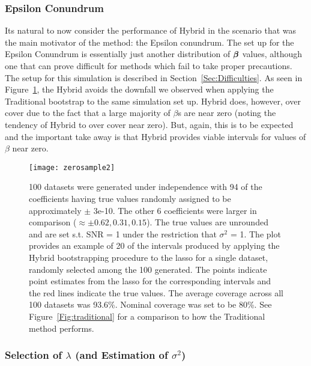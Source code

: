 \subsubsection{Epsilon Conundrum}\label{Sec:Epsilon}

Its natural to now consider the performance of Hybrid in the scenario that was the main motivator of the method: the Epsilon conundrum. The set up for the Epsilon Conundrum is essentially just another distribution of $\boldsymbol{\beta}$ values, although one that can prove difficult for methods which fail to take proper precautions. The setup for this simulation is described in Section~\ref{Sec:Difficulties}. As seen in Figure~\ref{Fig:zerosample2}, the Hybrid avoids the downfall we observed when applying the Traditional bootstrap to the same simulation set up. Hybrid does, however, over cover due to the fact that a large majority of $\beta$s are near zero (noting the tendency of Hybrid to over cover near zero). But, again, this is to be expected and the important take away is that Hybrid provides viable intervals for values of $\beta$ near zero.

\begin{figure}[hbtp]
  \texttt{[image: zerosample2]}
  \caption{\label{Fig:zerosample2} 100 datasets were generated under independence with 94 of the coefficients having true values randomly assigned to be approximately $\pm$ 3e-10. The other 6 coefficients were larger in comparison ($\approx \pm 0.62, 0.31, 0.15$). The true values are unrounded and are set s.t. SNR = 1 under the restriction that $\sigma^2$ = 1. The plot provides an example of 20 of the intervals produced by applying the Hybrid bootstrapping procedure to the lasso for a single dataset, randomly selected among the 100 generated. The points indicate point estimates from the lasso for the corresponding intervals and the red lines indicate the true values. The average coverage across all 100 datasets was 93.6\%. Nominal coverage was set to be 80\%. See Figure~\ref{Fig:traditional} for a comparison to how the Traditional method performs.}
\end{figure}


\subsubsection{Selection of \texorpdfstring{$\lambda$}{lambda} (and Estimation of \texorpdfstring{$\sigma^2$}{sigma squared})}\label{Sec:lambda}

